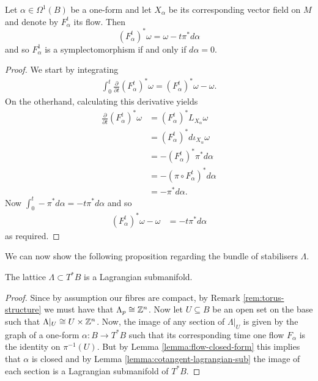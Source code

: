 \begin{lemma}\label{lemma:flow-closed-form}
    Let $\alpha \in \Omega^1(B)$ be a one-form and let $X_{\alpha}$ be its corresponding vector field on $M$ and denote by $F_{\alpha}^t$ its flow.
    Then
    $$
        (F_{\alpha}^t)^*\omega = \omega - t\pi^*d\alpha
    $$
    and so $F_{\alpha}^1$ is a symplectomorphism if and only if $d\alpha=0$.
\end{lemma}
\begin{proof}
    We start by integrating
    \begin{align*}
        \int_{0}^{t}\frac{\partial}{\partial t}(F_{\alpha}^t)^*\omega = (F_{\alpha}^t)^*\omega - \omega.
    \end{align*}
    On the otherhand, calculating this derivative yields
    \begin{align*}
        \frac{\partial}{\partial t}(F_{\alpha}^t)^*\omega & =  (F_{\alpha}^t)^*L_{X_{\alpha}}\omega     \\
                                                          & = (F_{\alpha}^t)^*d\iota_{X_{\alpha}}\omega \\
                                                          & = -(F_{\alpha}^t)^*\pi^* d\alpha            \\
                                                          & = - (\pi \circ F_{\alpha}^t)^*d\alpha       \\
                                                          & = -\pi^*d\alpha.
    \end{align*}
    Now $\int_{0}^{t}-\pi^*d\alpha = -t\pi^*d\alpha$ and so
    \begin{align*}
        (F_{\alpha}^t)^*\omega - \omega & = -t\pi^*d\alpha
    \end{align*}
    as required.
\end{proof}

We can now show the following proposition regarding the bundle of stabilisers
$\Lambda$.

\begin{prop} \label{prop:stabiliser-lagr}
    The lattice $\Lambda \subset T^*B$ is a Lagrangian submanifold.
\end{prop}
\begin{proof}
    Since by assumption our fibres are compact, by Remark \ref{rem:torus-structure} we must have that $\Lambda_p \cong \mathbb{Z}^n$. Now let $U \subseteq B$ be an open set on the base such that
    $\Lambda|_{U} \cong U \times \mathbb{Z}^n$. Now, the image of any section of $\Lambda|_{U}$ is given by the graph of a one-form $\alpha: B \to T^*B$ such that
    its corresponding time one flow $F_{\alpha}$ is the identity on $\pi^{-1}(U)$. But by Lemma \ref{lemma:flow-closed-form} this implies that $\alpha$ is closed and by
    Lemma \ref{lemma:cotangent-lagrangian-sub} the image of each section is a Lagrangian submanifold of $T^*B$.
\end{proof}

